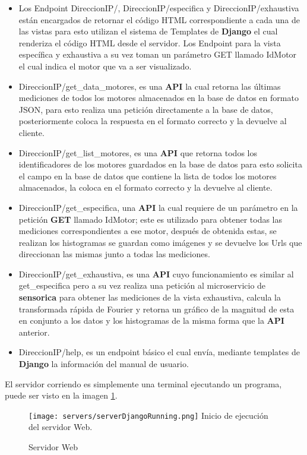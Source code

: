     \begin{itemize}
        \item Los Endpoint DireccionIP/, DireccionIP/especifica y DireccionIP/exhaustiva
            están encargados de retornar el código HTML correspondiente a cada una de
            las vistas  para esto utilizan el sistema de Templates de \textbf{Django} el cual
            renderiza el código HTML desde el servidor. Los Endpoint para la vista
            específica y exhaustiva a su vez toman un parámetro GET llamado IdMotor el
            cual indica el motor que va a ser visualizado.
        \item DireccionIP/get\_data\_motores, es una \textbf{API}  la cual
            retorna las últimas mediciones de todos los
            motores almacenados en la base de datos en formato JSON, para esto realiza
            una petición directamente a la base de datos, posteriormente
            coloca la respuesta en el
            formato correcto y la devuelve al cliente.
        \item  DireccionIP/get\_list\_motores, es una \textbf{API} que
            retorna todos los identificadores de los  motores guardados en la base
            de datos para esto solicita el campo en la base de datos que contiene la
            lista de todos los motores almacenados, la coloca en el formato correcto y
            la devuelve al cliente.
        \item DireccionIP/get\_especifica, una \textbf{API} la cual
            requiere de un parámetro en la petición \textbf{GET} llamado IdMotor;
            este es utilizado para obtener todas las mediciones correspondientes a ese motor,
            después de obtenida estas, se realizan los histogramas se guardan
            como imágenes y se devuelve los Urls que direccionan las mismas junto a todas las
            mediciones.
        \item DireccionIP/get\_exhaustiva, es una \textbf{API}
            cuyo funcionamiento es similar al get\_especifica
            pero a su vez realiza una petición al microservicio de \textbf{sensorica}
            para obtener las mediciones de la vista
            exhaustiva, calcula la transformada rápida de Fourier y retorna un gráfico de
            la magnitud de esta en conjunto a los datos y los histogramas de la misma forma
            que la \textbf{API} anterior.

        \item DireccionIP/help, es un endpoint básico el cual envía, mediante
            templates de \textbf{Django} la información del manual de usuario.
    \end{itemize}

    El servidor corriendo es simplemente una terminal ejecutando un programa,
    puede ser visto en la imagen \ref{img:serverWebRunning}.

	\begin{figure}[htb]
		\centering
        \caption{Servidor Web}
        \texttt{[image: servers/serverDjangoRunning.png]}
        Inicio de ejecución del servidor Web.    \label{img:serverWebRunning}
	\end{figure}


